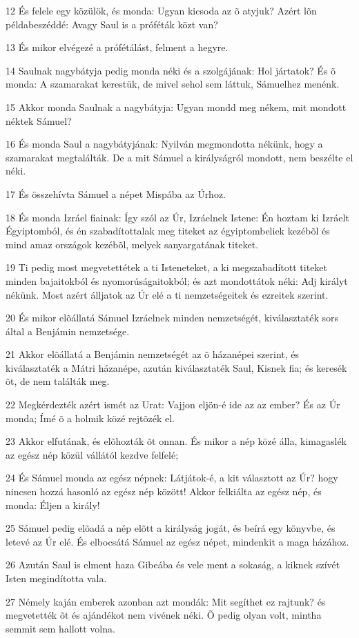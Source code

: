 \par 12 És felele egy közülök, és monda: Ugyan kicsoda az õ atyjuk? Azért lõn példabeszéddé: Avagy Saul is a próféták közt van?
\par 13 És mikor elvégezé a prófétálást, felment a hegyre.
\par 14 Saulnak nagybátyja pedig monda néki és a szolgájának: Hol jártatok? És õ monda: A szamarakat kerestük, de mivel sehol sem láttuk, Sámuelhez menénk.
\par 15 Akkor monda Saulnak a nagybátyja: Ugyan mondd meg nékem, mit mondott néktek Sámuel?
\par 16 És monda Saul a nagybátyjának: Nyilván megmondotta nékünk, hogy a szamarakat megtalálták. De a mit Sámuel a királyságról mondott, nem beszélte el néki.
\par 17 És összehívta Sámuel a népet Mispába az Úrhoz.
\par 18 És monda Izráel fiainak: Így szól az Úr, Izráelnek Istene: Én hoztam ki Izráelt Égyiptomból, és én szabadítottalak meg titeket az égyiptombeliek kezébõl és mind amaz országok kezébõl, melyek sanyargatának titeket.
\par 19 Ti pedig most megvetettétek a ti Isteneteket, a ki megszabadított titeket minden bajaitokból és nyomorúságaitokból; és azt mondottátok néki: Adj királyt nékünk. Most azért álljatok az Úr elé a ti nemzetségeitek és ezreitek szerint.
\par 20 És mikor elõállatá Sámuel Izráelnek minden nemzetségét, kiválasztaték sors által a Benjámin nemzetsége.
\par 21 Akkor elõállatá a Benjámin nemzetségét az õ házanépei szerint, és kiválasztaték a Mátri házanépe, azután kiválasztaték Saul, Kisnek fia; és keresék õt, de nem találták meg.
\par 22 Megkérdezték azért ismét az Urat: Vajjon eljön-é ide az az ember? És az Úr monda; Ímé õ a holmik közé rejtõzék el.
\par 23 Akkor elfutának, és elõhozták õt onnan. És mikor a nép közé álla, kimagaslék az egész nép közül vállától kezdve felfelé;
\par 24 És Sámuel monda az egész népnek: Látjátok-é, a kit választott az Úr? hogy nincsen hozzá hasonló az egész nép között! Akkor felkiálta az egész nép, és monda: Éljen a király!
\par 25 Sámuel pedig elõadá a nép elõtt a királyság jogát, és beírá egy könyvbe, és letevé az Úr elé. És elbocsátá Sámuel az egész népet, mindenkit a maga házához.
\par 26 Azután Saul is elment haza Gibeába és vele ment a sokaság, a kiknek szívét Isten megindította vala.
\par 27 Némely kaján emberek azonban azt mondák: Mit segíthet ez rajtunk? és megvetették õt és ajándékot nem vivének néki. Õ pedig olyan volt, mintha semmit sem hallott volna.

